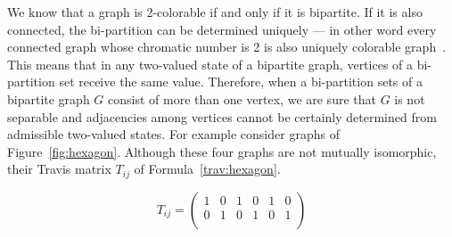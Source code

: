\documentclass[%
12pt,
prereprint,
showpacs,
showkeys,
preprintnumbers,
amsmath,amssymb,
aps,
pra,
longbibliography,
notitlepage
]{revtex4-1}
\theoremstyle{definition}
\begin{document}
        We know that a graph is 2-colorable if and only if it is bipartite. If it is also connected, the bi-partition can be determined uniquely --- in other word every connected graph whose chromatic number is 2 is also uniquely colorable graph~\cite{HARARY1969264}. This means that in any two-valued state of a bipartite graph, vertices of a bi-partition set receive the same value. Therefore, when a bi-partition sets of a bipartite graph $G$ consist of more than one vertex, we are sure that $G$ is not separable and adjacencies among vertices cannot be certainly determined from admissible two-valued states. For example consider graphs of Figure~\ref{fig:hexagon}. Although these four graphs are not mutually isomorphic, their Travis matrix $T_{ij}$ of Formula~\ref{trav:hexagon}.

        \begin{equation}\label{trav:hexagon}
                T_{ij}=\begin{pmatrix}
                        1 &  0 & 1 & 0 & 1 & 0  \\
                        0 &  1 & 0 & 1 & 0 & 1  \\
                \end{pmatrix}
        \end{equation}
\end{document}
